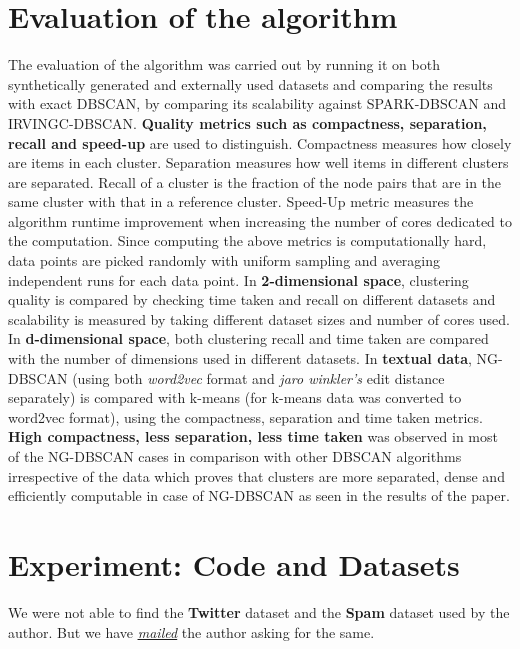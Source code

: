 \documentclass[acmsmall]{acmart}
\begin{document}
\section* {Evaluation of the algorithm}
The evaluation of the algorithm was carried out by running it on both synthetically generated and externally used datasets and comparing the results with exact DBSCAN, by comparing its scalability against SPARK-DBSCAN and IRVINGC-DBSCAN.
\textbf{Quality metrics such as compactness, separation, recall and speed-up} are used to distinguish. \newline
Compactness measures how closely are items in each cluster. Separation measures how well items in different clusters are separated. Recall of a cluster is the fraction of the node pairs that are in the same cluster with that in a reference cluster. Speed-Up metric measures the algorithm runtime improvement when increasing the number of cores dedicated to the computation. \newline
Since computing the above metrics is computationally hard, data points are picked randomly with uniform sampling and averaging independent runs for each data point. \newline
In \textbf{2-dimensional space}, clustering quality is compared by checking time taken and recall on different datasets and scalability is measured by taking different dataset sizes and number of cores used. \newline
In \textbf{d-dimensional space}, both clustering recall and time taken are compared with the number of dimensions used in different datasets. \newline
In \textbf{textual data}, NG-DBSCAN (using both \textit{word2vec} format and 
\textit{jaro winkler’s} edit distance separately) is compared with k-means (for k-means data was converted to word2vec format), using the compactness, separation and time taken metrics. \newline
\textbf{High compactness, less separation, less time taken} was observed in most of the NG-DBSCAN cases in comparison with other DBSCAN algorithms irrespective of the data which proves that clusters are more separated, dense and efficiently computable in case of NG-DBSCAN as seen in the results of the paper.


\section* {Experiment: Code and Datasets }
We were not able to find the \textbf{Twitter} dataset and the \textbf{Spam} dataset used by the author. But we have \href{https://drive.google.com/drive/folders/1OMBY0WbDgKs0JURcQVRG8VtPgirTbuBQ?usp=sharing}{\textit{\underline{mailed}}} the author asking for the same.
\end{document}
